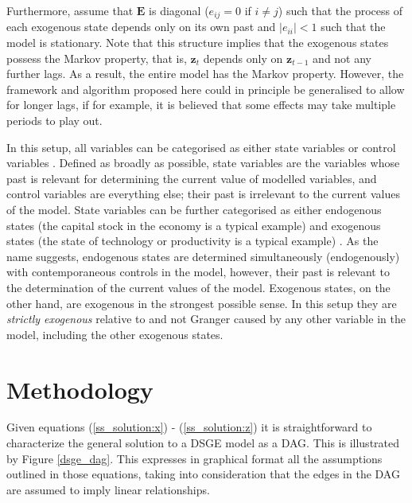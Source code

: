 \documentclass{article}
\begin{document}
Furthermore, assume that $\mathbf{E}$ is diagonal ($e_{ij} = 0$ if $i \not = j$) such that the process of each exogenous state depends only on its own past and $|e_{ii}| < 1$ such that the model is stationary. Note that this structure implies that the exogenous states possess the Markov property, that is, $\mathbf{z}_t$ depends only on $\mathbf{z}_{t-1}$ and not any further lags. As a result, the entire model has the Markov property. However, the framework and algorithm proposed here could in principle be generalised to allow for longer lags, if for example, it is believed that some effects may take multiple periods to play out.

In this setup, all variables can be categorised as either state variables or control variables \parencite{fernandez2016solution}. Defined as broadly as possible, state variables are the variables whose past is relevant for determining the current value of modelled variables, and control variables are everything else; their past is irrelevant to the current values of the model. State variables can be further categorised as either endogenous states (the capital stock in the economy is a typical example) and exogenous states (the state of technology or productivity is a typical example) \parencite{ravenna2007vector}. As the name suggests, endogenous states are determined simultaneously (endogenously) with contemporaneous controls in the model, however, their past is relevant to the determination of the current values of the model. Exogenous states, on the other hand, are exogenous in the strongest possible sense. In this setup they are \textit{strictly exogenous} relative to and not Granger caused by any other variable in the model, including the other exogenous states.

\section{Methodology} \label{methodology}

Given equations (\ref{ss_solution:x}) - (\ref{ss_solution:z}) it is straightforward to characterize the general solution to a DSGE model as a DAG. This is illustrated by Figure \ref{dsge_dag}. This expresses in graphical format all the assumptions outlined in those equations, taking into consideration that the edges in the DAG are assumed to imply linear relationships. 
\end{document}
